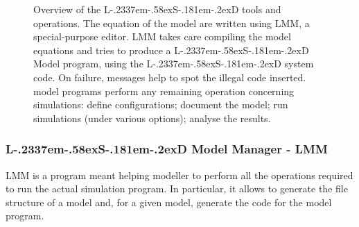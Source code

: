 \documentclass [11pt,a4paper] {book}
\def\LsD{{L\kern-.2337em\lower-.58ex\hbox{S}\kern-.181em\lower-.2ex\hbox{D}}\xspace}
\begin{document}
\begin{figure}[ht]
  \centering
  \caption{\small Overview of the \LsD tools and operations. The equation of the model are written using LMM, a special-purpose editor. LMM takes care compiling the model equations and tries to produce a \LsD Model program, using the \LsD system code. On failure, messages help to spot the illegal code inserted. \newline \LsD model programs perform any remaining operation concerning simulations: define configurations; document the model; run simulations (under various options); analyse the results.}
   \label{fig:lsdwork}
\end{figure}
\clearpage 

\subsubsection{\LsD Model Manager - LMM}

LMM is a program meant helping modeller to perform all the operations required to run the actual simulation program. In particular, it allows to generate the file structure of a model and, for a given model, generate the code for the model program.
\end{document}
